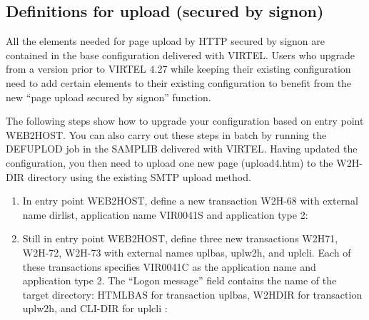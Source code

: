 \documentclass[letterpaper,10pt,english]{sphinxmanual}
\begin{document}

\subsection{Definitions for upload (secured by signon)}
\label{\detokenize{audit_operations_ and_performance:index-57}}\label{\detokenize{audit_operations_ and_performance:definitions-for-upload-secured-by-signon}}
All the elements needed for page upload by HTTP secured by signon are contained in the base configuration delivered with VIRTEL. Users who upgrade from a version prior to VIRTEL 4.27 while keeping their existing configuration need to add certain elements to their existing configuration to benefit from the new “page upload secured by signon” function.

The following steps show how to upgrade your configuration based on entry point WEB2HOST. You can also carry out these steps in batch by running the DEFUPLOD job in the SAMPLIB delivered with VIRTEL. Having updated the configuration, you then need to upload one new page (upload4.htm) to the W2H-DIR directory using the existing SMTP upload method.
\begin{enumerate}
\item {} 
In entry point WEB2HOST, define a new transaction W2H-68 with external name dirlist, application name VIR0041S and application type 2:

\end{enumerate}

\begin{enumerate}
\setcounter{enumi}{1}
\item {} 
Still in entry point WEB2HOST, define three new transactions W2H\textendash{}71, W2H-72, W2H-73 with external names uplbas, uplw2h, and uplcli. Each of these transactions specifies VIR0041C as the application name and application type 2. The “Logon message” field contains the name of the target directory: HTMLBAS for transaction uplbas, W2HDIR for transaction uplw2h, and CLI-DIR for uplcli :

\end{enumerate}

 

 
\end{document}
